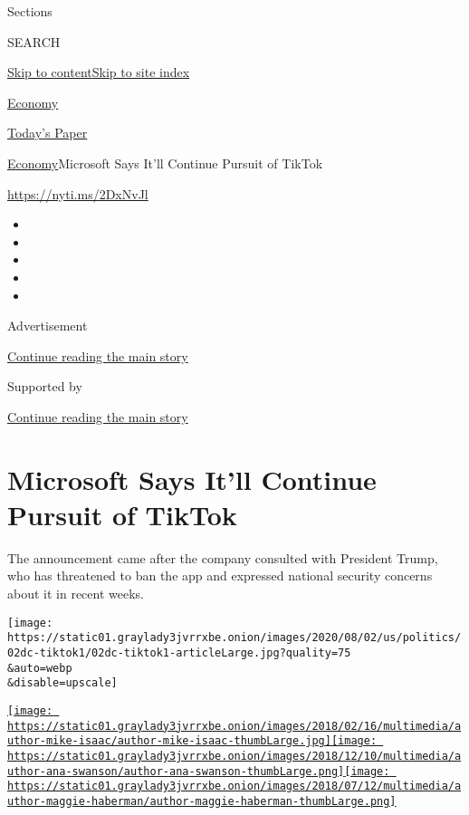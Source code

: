 Sections

SEARCH

\protect\hyperlink{site-content}{Skip to
content}\protect\hyperlink{site-index}{Skip to site index}

\href{https://www.nytimes3xbfgragh.onion/section/business/economy}{Economy}

\href{https://myaccount.nytimes3xbfgragh.onion/auth/login?response_type=cookie\&client_id=vi}{}

\href{https://www.nytimes3xbfgragh.onion/section/todayspaper}{Today's
Paper}

\href{/section/business/economy}{Economy}\textbar{}Microsoft Says It'll
Continue Pursuit of TikTok

\url{https://nyti.ms/2DxNvJl}

\begin{itemize}
\item
\item
\item
\item
\item
\end{itemize}

Advertisement

\protect\hyperlink{after-top}{Continue reading the main story}

Supported by

\protect\hyperlink{after-sponsor}{Continue reading the main story}

\hypertarget{microsoft-says-itll-continue-pursuit-of-tiktok}{%
\section{Microsoft Says It'll Continue Pursuit of
TikTok}\label{microsoft-says-itll-continue-pursuit-of-tiktok}}

The announcement came after the company consulted with President Trump,
who has threatened to ban the app and expressed national security
concerns about it in recent weeks.

\texttt{[image: https://static01.graylady3jvrrxbe.onion/images/2020/08/02/us/politics/02dc-tiktok1/02dc-tiktok1-articleLarge.jpg?quality=75\\\&auto=webp\\\&disable=upscale]}

\href{https://www.nytimes3xbfgragh.onion/by/mike-isaac}{\texttt{[image: https://static01.graylady3jvrrxbe.onion/images/2018/02/16/multimedia/author-mike-isaac/author-mike-isaac-thumbLarge.jpg]}}\href{https://www.nytimes3xbfgragh.onion/by/ana-swanson}{\texttt{[image: https://static01.graylady3jvrrxbe.onion/images/2018/12/10/multimedia/author-ana-swanson/author-ana-swanson-thumbLarge.png]}}\href{https://www.nytimes3xbfgragh.onion/by/maggie-haberman}{\texttt{[image: https://static01.graylady3jvrrxbe.onion/images/2018/07/12/multimedia/author-maggie-haberman/author-maggie-haberman-thumbLarge.png]}}

